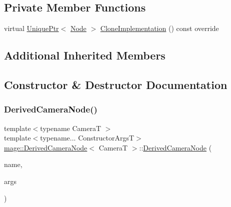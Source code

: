 \subsection*{Private Member Functions}
\begin{DoxyCompactItemize}
\item 
virtual \hyperlink{namespacemage_a8c307fbcc33bce9b7f2aa4c26c3b95cf}{Unique\+Ptr}$<$ \hyperlink{classmage_1_1_node}{Node} $>$ \hyperlink{classmage_1_1_derived_camera_node_aa965751029ebd6b41d3805b499a8304e}{Clone\+Implementation} () const override
\end{DoxyCompactItemize}
\subsection*{Additional Inherited Members}


\subsection{Constructor \& Destructor Documentation}
\hypertarget{classmage_1_1_derived_camera_node_a782a23d04ba78be88b0f73d9dde4552f}{}\label{classmage_1_1_derived_camera_node_a782a23d04ba78be88b0f73d9dde4552f} 
\subsubsection{\texorpdfstring{Derived\+Camera\+Node()}{DerivedCameraNode()}\hspace{0.1cm}{\footnotesize\ttfamily [1/4]}}
{\footnotesize\ttfamily template$<$typename CameraT $>$ \\
template$<$typename... Constructor\+ArgsT$>$ \\
\hyperlink{classmage_1_1_derived_camera_node}{mage\+::\+Derived\+Camera\+Node}$<$ CameraT $>$\+::\hyperlink{classmage_1_1_derived_camera_node}{Derived\+Camera\+Node} (\begin{DoxyParamCaption}\item[{const string \&}]{name,  }\item[{Constructor\+ArgsT \&\&...}]{args }\end{DoxyParamCaption})\hspace{0.3cm}{\ttfamily [explicit]}}

\hypertarget{classmage_1_1_derived_camera_node_a629ba0e2c1e6b29e6d45996256c59dbe}{}\label{classmage_1_1_derived_camera_node_a629ba0e2c1e6b29e6d45996256c59dbe} 
